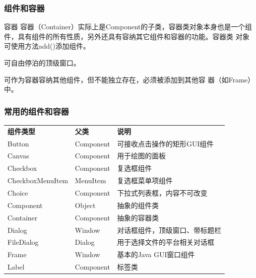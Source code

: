 \begin{frame}[fragile] %
  \frametitle{组件和容器}
  
  \begin{block}{容器}
    容器（Container）实际上是Component的子类，容器类对象本身也是一个组
    件，具有组件的所有性质，另外还具有容纳其它组件和容器的功能。容器类
    对象可使用方法add()添加组件。
  \end{block}

  \pause
  
  
  \begin{description}\kai
  \item[\fbox{java.awt.Window}] 可自由停泊的顶级窗口。
  \item[\fbox{java.awt.Panel}] 可作为容器容纳其他组件，但不能独立存在，必须被添加到其他容
    器（如Frame）中。
  \end{description}
\end{frame}

\begin{frame}[fragile] %
  \frametitle{常用的组件和容器 }

  \begin{table}
    \scriptsize
    \setlength{\extrarowheight}{1.2mm}
    \begin{tabular}{lll}
      {\bf 组件类型} & {\bf 父类}  & {\bf 说明}\\
      Button & Component & 可接收点击操作的矩形GUI组件\\
      Canvas & Component & 用于绘图的面板\\
      Checkbox & Component & 复选框组件\\
      CheckboxMenuItem & MenuItem & 复选框菜单项组件\\
      Choice & Component & 下拉式列表框，内容不可改变\\
      Component & Object & 抽象的组件类\\
      Container & Component & 抽象的容器类\\
      Dialog & Window & 对话框组件，顶级窗口、带标题栏\\
      FileDialog & Dialog & 用于选择文件的平台相关对话框\\
      Frame & Window & 基本的Java GUI窗口组件\\
      Label & Component & 标签类\\
    \end{tabular}
  \end{table}
\end{frame}

